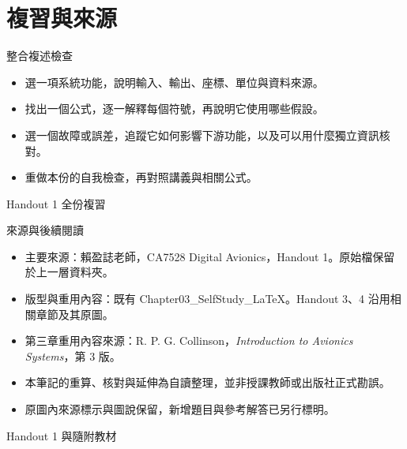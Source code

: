 \documentclass[aspectratio=169,11pt]{beamer}
\newcommand{\src}[1]{\par\vfill{\scriptsize\color{teal}#1}}
\newcommand{\slide}[3]{\begin{frame}[t]{#1}#3\src{#2}\end{frame}}
\newcommand{\bi}{\begin{itemize}\setlength{\itemsep}{5pt}}
\newcommand{\ei}{\end{itemize}}
\begin{document}
\section{複習與來源}
\slide{整合複述檢查}{Handout 1 全份複習}{
\bi
\item 選一項系統功能，說明輸入、輸出、座標、單位與資料來源。
\item 找出一個公式，逐一解釋每個符號，再說明它使用哪些假設。
\item 選一個故障或誤差，追蹤它如何影響下游功能，以及可以用什麼獨立資訊核對。
\item 重做本份的自我檢查，再對照講義與相關公式。
\ei
}
\slide{來源與後續閱讀}{Handout 1 與隨附教材}{
\small
\bi
\item 主要來源：賴盈誌老師，CA7528 Digital Avionics，Handout 1。原始檔保留於上一層資料夾。
\item 版型與重用內容：既有 Chapter03\_SelfStudy\_LaTeX。Handout 3、4 沿用相關章節及其原圖。
\item 第三章重用內容來源：R. P. G. Collinson，\textit{Introduction to Avionics Systems}，第 3 版。
\item 本筆記的重算、核對與延伸為自讀整理，並非授課教師或出版社正式勘誤。
\item 原圖內來源標示與圖說保留，新增題目與參考解答已另行標明。
\ei
}
\end{document}
